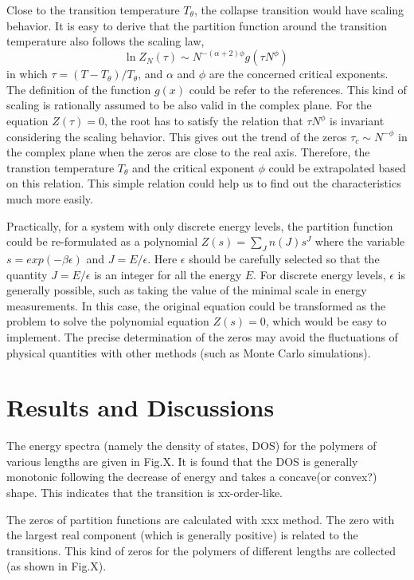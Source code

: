 \documentclass[preprint,preprintnumbers,amsmath,amssymb,showpacs,pre]{revtex4-1}
\begin{document}
Close to the transition temperature $T_{\theta}$, the collapse transition would
have scaling behavior. It is easy to derive that the partition function around
the transition temperature also follows the scaling law,
\begin{equation}
\ln Z_N(\tau) \sim N^{-(\alpha+2)\phi} g(\tau N^{\phi}) \,
\end{equation}
in which $\tau=(T-T_{\theta})/T_{\theta}$, and $\alpha$ and $\phi$ are the
concerned critical exponents. The definition of the function $g(x)$ could be
refer to the references. This kind of scaling is rationally assumed to be also
valid in the complex plane. For the equation $Z(\tau)=0$, the root has to
satisfy the relation that $\tau N^{\phi}$ is invariant considering the scaling
behavior. This gives out the trend of the zeros $\tau_c \sim N^{-\phi}$ in the
complex plane when the zeros are close to the real axis. Therefore, the
transtion temperature $T_{\theta}$ and the critical exponent $\phi$ could be
extrapolated based on this relation. This simple relation could help us to find
out the characteristics much more easily.

Practically, for a system with only discrete energy levels, the partition
function could be
re-formulated as a polynomial $Z(s)=\sum_J n(J) s^J$ where the variable
$s=exp(-\beta\epsilon)$ and $J=E/\epsilon$. Here $\epsilon$ should be carefully
selected so that the quantity $J=E/\epsilon$ is an integer for all the energy
$E$. For discrete energy levels, $\epsilon$ is generally possible, such as
taking the value of the minimal scale in energy measurements. In this case, the
original equation could be transformed as the problem to solve the polynomial
equation $Z(s)=0$, which would be easy to implement. The precise determination
of the zeros may avoid the fluctuations of physical quantities with other
methods (such as Monte Carlo simulations).

\section{Results and Discussions}

The energy spectra (namely the density of states, DOS) for the polymers of
various lengths are given in Fig.X.
It is found that the DOS is generally monotonic following the decrease of
energy and takes a concave(or convex?) shape. This indicates that the
transition is xx-order-like.

The zeros of partition functions are calculated with xxx method. The zero
with the largest real component (which is generally positive) is related to
the transitions. This kind of zeros for the polymers of different lengths
are collected (as shown in Fig.X).
\end{document}
